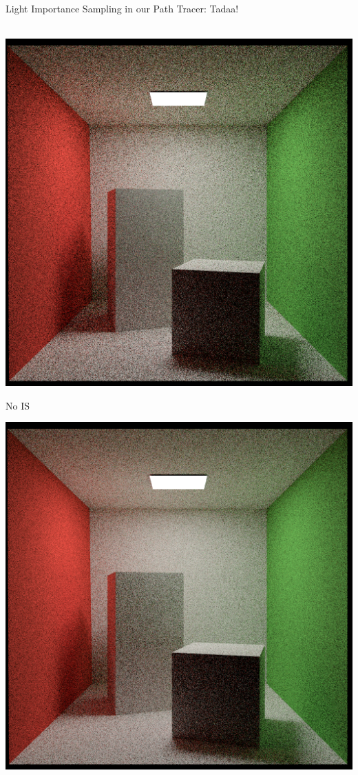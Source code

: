 \documentclass[utf8,stillsansserifmath,fleqn,t]{beamer}
\begin{document}
\begin{frame}[label=light-importance-sampling-3]
\frametitle{\insertsection}
Light Importance Sampling in our Path Tracer: Tadaa!\\~\\
\begin{minipage}[t]{.33\textwidth}
\includegraphics[width=\textwidth]{./fig/pathtracer-result-08-1.png}
\centerline{No IS}
\end{minipage}\hfill
\begin{minipage}[t]{.33\textwidth}
\includegraphics[width=\textwidth]{./fig/pathtracer-result-09-1.png}

\end{minipage}
\end{frame}
\end{document}
